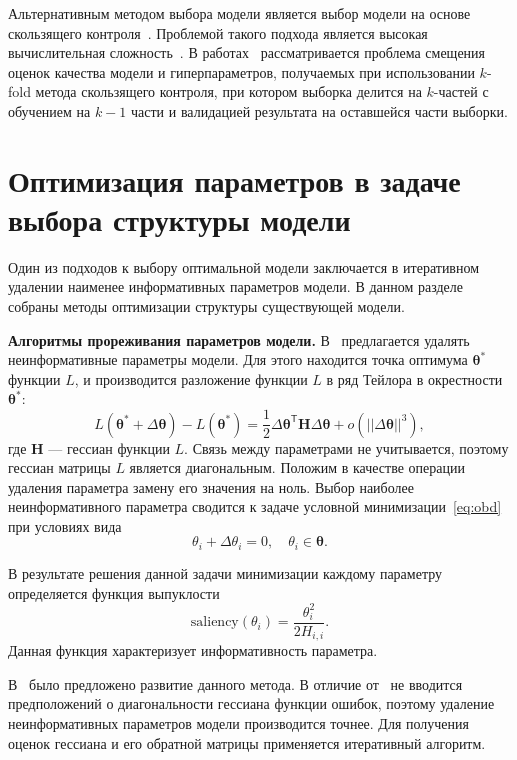 Альтернативным методом выбора модели является выбор модели на основе скользящего контроля~\cite{cv_ms, tokmakova}. Проблемой такого подхода является высокая вычислительная сложность~\cite{expensive, expensive2}. В работах~\cite{bias,bias2} рассматривается проблема смещения оценок качества модели и гиперпараметров, получаемых при использовании $k$-fold метода скользящего контроля, при котором выборка делится на $k$-частей с обучением на $k-1$ части и валидацией результата на оставшейся части выборки. 


\section{Оптимизация параметров в задаче выбора структуры модели}
Один из подходов к выбору оптимальной модели заключается в итеративном удалении наименее информативных параметров модели. 
В данном разделе собраны методы оптимизации структуры существующей модели. 

\textbf{Алгоритмы прореживания параметров модели.}
В~\cite{obd} предлагается удалять неинформативные параметры модели.
Для этого находится точка оптимума $\boldsymbol{\theta}^{*}$ функции $L$, и производится разложение функции $L$ в ряд Тейлора в окрестности $\boldsymbol{\theta}^{*}$:
\begin{equation}
\label{eq:obd}
    L(\boldsymbol{\theta}^{*} + \Delta\boldsymbol{\theta})  - L(\boldsymbol{\theta}^{*}) = \frac{1}{2} \Delta\boldsymbol{\theta}^{\mathsf{T}}\mathbf{H}\Delta\boldsymbol{\theta} + o(||\Delta\boldsymbol{\theta}||^{3}),
\end{equation}
где $\mathbf{H}$ --- гессиан функции $L$. Связь между параметрами не учитывается, поэтому гессиан матрицы $L$ является диагональным.
Положим в качестве операции удаления параметра замену его значения на ноль. Выбор наиболее неинформативного параметра сводится к задаче условной минимизации~\eqref{eq:obd} при условиях вида
\[
    {\theta}_i + \Delta{\theta}_i = 0, \quad  {\theta}_i \in \boldsymbol{\theta}.
\] 

В результате решения данной задачи минимизации каждому параметру определяется функция выпуклости
\[
    \text{saliency}({\theta}_i) = \frac{{\theta}^2_i}{2H_{i,i}}.
\]
Данная функция характеризует информативность параметра.

В~\cite{obs} было предложено развитие данного метода. В отличие от~\cite{obd} не вводится предположений о диагональности гессиана функции ошибок, поэтому удаление неинформативных параметров модели производится точнее. Для получения оценок гессиана и его обратной матрицы применяется итеративный алгоритм.

